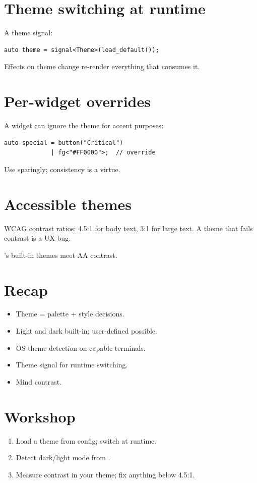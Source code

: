 \section{Theme switching at runtime}

A theme signal:

\begin{lstlisting}
auto theme = signal<Theme>(load_default());
\end{lstlisting}

Effects on theme change re-render everything that consumes
it.

\section{Per-widget overrides}

A widget can ignore the theme for accent purposes:

\begin{lstlisting}
auto special = button("Critical")
             | fg<"#FF0000">;  // override
\end{lstlisting}

Use sparingly; consistency is a virtue.

\section{Accessible themes}

WCAG contrast ratios: 4.5:1 for body text, 3:1 for large
text. A theme that fails contrast is a UX bug.

\maya{}'s built-in themes meet AA contrast.

\section{Recap}

\begin{recap}
\begin{itemize}[leftmargin=*]
  \item Theme = palette + style decisions.
  \item Light and dark built-in; user-defined possible.
  \item OS theme detection on capable terminals.
  \item Theme signal for runtime switching.
  \item Mind contrast.
\end{itemize}
\end{recap}

\section*{Workshop}

\begin{enumerate}[leftmargin=*]
  \item Load a theme from config; switch at runtime.
  \item Detect dark/light mode from .
  \item Measure contrast in your theme; fix anything
    below 4.5:1.
\end{enumerate}
